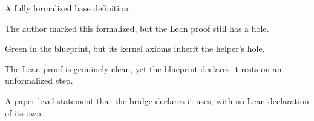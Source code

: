 %

\begin{definition}[Base]\label{def:base}
  \leanok
  A fully formalized base definition.
\end{definition}

\begin{lemma}\label{lem:helper}
  \leanok
  The author marked this formalized, but the Lean proof still has a hole.
\end{lemma}

\begin{theorem}\label{thm:main}
  \leanok
  Green in the blueprint, but its kernel axioms inherit the helper's hole.
\end{theorem}

\begin{theorem}\label{thm:bridge}
  \leanok
  The Lean proof is genuinely clean, yet the blueprint declares it rests on an
  unformalized step.
\end{theorem}

\begin{lemma}\label{thm:informal-step}
  A paper-level statement that the bridge declares it uses, with no Lean
  declaration of its own.
\end{lemma}
